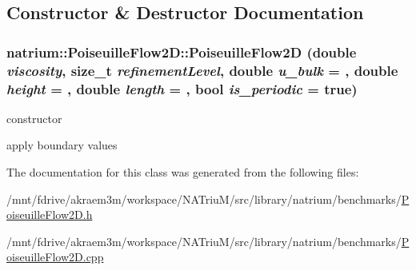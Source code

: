 \subsection{Constructor \& Destructor Documentation}
\hypertarget{classnatrium_1_1PoiseuilleFlow2D_a377e6996a9b45552b9a56aa96d0325ee}{
\subsubsection[{PoiseuilleFlow2D}]{\setlength{\rightskip}{0pt plus 5cm}natrium::PoiseuilleFlow2D::PoiseuilleFlow2D (double {\em viscosity}, \/  size\_\-t {\em refinementLevel}, \/  double {\em u\_\-bulk} = {}, \/  double {\em height} = {}, \/  double {\em length} = {}, \/  bool {\em is\_\-periodic} = {\ttfamily true})}}
\label{classnatrium_1_1PoiseuilleFlow2D_a377e6996a9b45552b9a56aa96d0325ee}


constructor 

apply boundary values 

The documentation for this class was generated from the following files:\begin{DoxyCompactItemize}
\item 
/mnt/fdrive/akraem3m/workspace/NATriuM/src/library/natrium/benchmarks/\hyperlink{PoiseuilleFlow2D_8h}{PoiseuilleFlow2D.h}\item 
/mnt/fdrive/akraem3m/workspace/NATriuM/src/library/natrium/benchmarks/\hyperlink{PoiseuilleFlow2D_8cpp}{PoiseuilleFlow2D.cpp}\end{DoxyCompactItemize}
